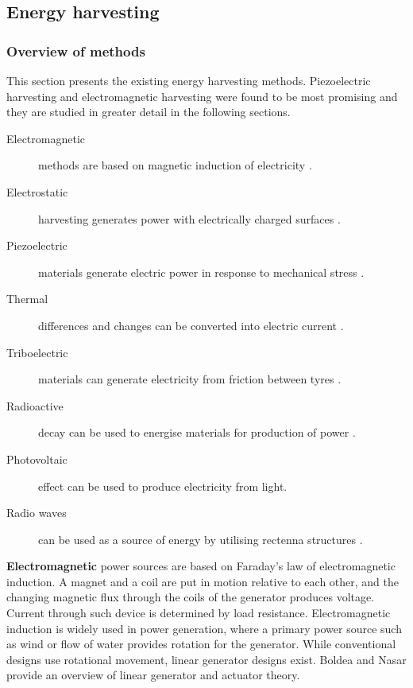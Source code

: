 \subsection{Energy harvesting}\label{sect:background}
\subsubsection{Overview of methods} \label{sect:overview}
This section presents the existing energy harvesting methods. Piezoelectric harvesting and electromagnetic harvesting were found to be most promising and they are studied in greater detail in the following sections.

\begin{description}
  \item[Electromagnetic] methods are based on magnetic induction of electricity \cite{Kubba2014}.
  \item[Electrostatic] harvesting generates power with electrically charged surfaces \cite{Kubba2014}.
  \item[Piezoelectric] materials generate electric power in response to mechanical stress \cite{Kubba2014}.
  \item[Thermal] differences and changes can be converted into electric current \cite{Bowen2014}.
  \item[Triboelectric] materials can generate electricity from friction between tyres \cite{Bowen2014}.
  \item[Radioactive] decay can be used to energise materials for production of power \cite{Lal2004}.
  \item[Photovoltaic] effect can be used to produce electricity from light.
  \item[Radio waves] can be used as a source of energy by utilising rectenna structures \cite{Patel2014}. 
\end{description}

\textbf{Electromagnetic} power sources are based on Faraday's law of electromagnetic induction. A magnet and a coil are put in motion relative to each other, and the changing magnetic flux through the coils of the generator produces voltage. Current through such device is determined by load resistance. Electromagnetic induction is widely used in power generation, where a primary power source such as wind or flow of water provides rotation for the generator. While conventional designs use rotational movement, linear generator designs exist. Boldea and Nasar \cite{Boldea1999} provide an overview of linear generator and actuator theory. 

